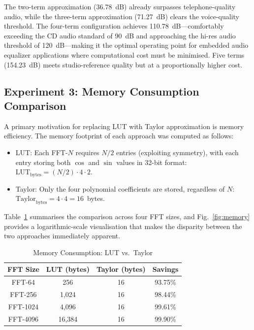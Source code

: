 \documentclass[conference]{IEEEtran}
\begin{document}
The two-term approximation (36.78~dB) already surpasses telephone-quality
audio, while the three-term approximation (71.27~dB) clears the voice-quality
threshold. The four-term configuration achieves 110.78~dB---comfortably
exceeding the CD audio standard of 90~dB and approaching the hi-res audio
threshold of 120~dB---making it the optimal operating point for embedded audio
equalizer applications where computational cost must be minimised. Five terms
(154.23~dB) meets studio-reference quality but at a proportionally higher cost.

\subsection{Experiment 3: Memory Consumption Comparison}

A primary motivation for replacing LUT with Taylor approximation is memory
efficiency. The memory footprint of each approach was computed as follows:
\begin{itemize}
    \item LUT: Each FFT-$N$ requires $N/2$ entries (exploiting
    symmetry), with each entry storing both $\cos$ and $\sin$ values in 32-bit
    format: $\text{LUT}_{\text{bytes}} = (N/2) \cdot 4 \cdot 2$.
    \item Taylor: Only the four polynomial coefficients are stored,
    regardless of $N$: $\text{Taylor}_{\text{bytes}} = 4 \cdot 4 = 16$~bytes.
\end{itemize}

Table~\ref{tab:memory} summarises the comparison across four FFT sizes, and
Fig.~\ref{fig:memory} provides a logarithmic-scale visualisation that makes
the disparity between the two approaches immediately apparent.

\begin{table}[H]
\caption{Memory Consumption: LUT vs.\ Taylor}
\label{tab:memory}
\centering
\renewcommand{\arraystretch}{1.3}
\begin{tabular}{c|c|c|c}
\toprule
\textbf{FFT Size} & \textbf{LUT (bytes)} & \textbf{Taylor (bytes)} &
\textbf{Savings} \\
\midrule
FFT-64   & 256    & 16 & 93.75\% \\
FFT-256  & 1{,}024 & 16 & 98.44\% \\
FFT-1024 & 4{,}096 & 16 & 99.61\% \\
FFT-4096 & 16{,}384 & 16 & 99.90\% \\
\bottomrule
\end{tabular}
\end{table}
\end{document}
